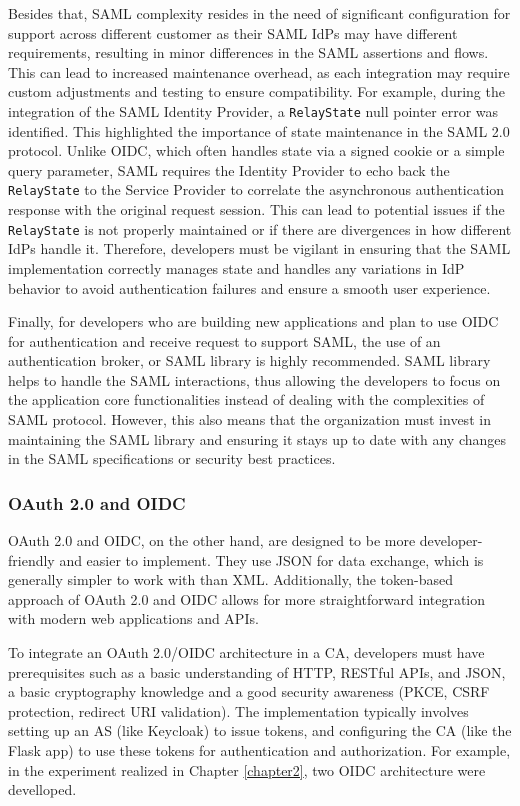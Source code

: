 \documentclass[../memoire.tex]{subfiles}
\begin{document}
Besides that, SAML complexity resides in the need of significant configuration for support across different customer as their SAML IdPs may have different requirements, resulting in minor differences in the SAML assertions and flows\cite[p.~136]{wilson2022}. This can lead to increased maintenance overhead, as each integration may require custom adjustments and testing to ensure compatibility. For example, during the integration of the SAML Identity Provider, a \texttt{RelayState} null pointer error was identified. This highlighted the importance of state maintenance in the SAML 2.0 protocol. Unlike OIDC, which often handles state via a signed cookie or a simple query parameter, SAML requires the Identity Provider to echo back the \texttt{RelayState} to the Service Provider to correlate the asynchronous authentication response with the original request session. This can lead to potential issues if the \texttt{RelayState} is not properly maintained or if there are divergences in how different IdPs handle it. Therefore, developers must be vigilant in ensuring that the SAML implementation correctly manages state and handles any variations in IdP behavior to avoid authentication failures and ensure a smooth user experience.

Finally, for developers who are building new applications and plan to use OIDC for authentication and receive request to support SAML, the use of an authentication broker, or SAML library is highly recommended\cite[p.~136]{wilson2022}. SAML library helps to handle the SAML interactions, thus allowing the developers to focus on the application core functionalities instead of dealing with the complexities of SAML protocol\cite[p.~136]{wilson2022}. However, this also means that the organization must invest in maintaining the SAML library and ensuring it stays up to date with any changes in the SAML specifications or security best practices.

\subsubsection{OAuth 2.0 and OIDC}

OAuth 2.0 and OIDC, on the other hand, are designed to be more developer-friendly and easier to implement. They use JSON for data exchange, which is generally simpler to work with than XML. Additionally, the token-based approach of OAuth 2.0 and OIDC allows for more straightforward integration with modern web applications and APIs. 

To integrate an OAuth 2.0/OIDC architecture in a CA, developers must have prerequisites such as a basic understanding of HTTP, RESTful APIs, and JSON, a basic cryptography knowledge and a good security awareness (PKCE, CSRF protection, redirect URI validation). The implementation typically involves setting up an AS (like Keycloak) to issue tokens, and configuring the CA (like the Flask app) to use these tokens for authentication and authorization. For example, in the experiment realized in Chapter \ref{chapter2}, two OIDC architecture were develloped. 
\end{document}
